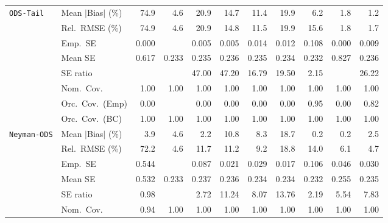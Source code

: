 \begin{landscape}
\begin{longtable}{llrrrrrrrrr}
\addlinespace[2pt]
\quad \texttt{ODS-Tail} & Mean $|$Bias$|$ (\%) & 74.9 & \cellcolor{rankthree}4.6 & 20.9 & 14.7 & 11.4 & 19.9 & 6.2 & \cellcolor{ranktwo}1.8 & \cellcolor{rankone}1.2 \\
 & Rel.\ RMSE (\%) & 74.9 & \cellcolor{rankthree}4.6 & 20.9 & 14.8 & 11.5 & 19.9 & 15.6 & \cellcolor{ranktwo}1.8 & \cellcolor{rankone}1.7 \\
 & Emp.\ SE & 0.000 &  & 0.005 & 0.005 & 0.014 & 0.012 & 0.108 & 0.000 & 0.009 \\
 & Mean SE & 0.617 & 0.233 & 0.235 & 0.236 & 0.235 & 0.234 & 0.232 & 0.827 & 0.236 \\
 & SE ratio &  &  & 47.00 & 47.20 & \cellcolor{ranktwo}16.79 & \cellcolor{rankthree}19.50 & \cellcolor{rankone}2.15 &  & 26.22 \\
 & Nom.\ Cov. & \cellcolor{rankone}1.00 & \cellcolor{rankone}1.00 & \cellcolor{rankone}1.00 & \cellcolor{rankone}1.00 & \cellcolor{rankone}1.00 & \cellcolor{rankone}1.00 & \cellcolor{rankone}1.00 & \cellcolor{rankone}1.00 & \cellcolor{rankone}1.00 \\
 & Orc.\ Cov.\ (Emp) & \cellcolor{rankthree}0.00 &  & \cellcolor{rankthree}0.00 & \cellcolor{rankthree}0.00 & \cellcolor{rankthree}0.00 & \cellcolor{rankthree}0.00 & \cellcolor{rankone}0.95 & \cellcolor{rankthree}0.00 & \cellcolor{ranktwo}0.82 \\
 & Orc.\ Cov.\ (BC) & \cellcolor{rankone}1.00 & \cellcolor{rankone}1.00 & \cellcolor{rankone}1.00 & \cellcolor{rankone}1.00 & \cellcolor{rankone}1.00 & \cellcolor{rankone}1.00 & \cellcolor{rankone}1.00 & \cellcolor{rankone}1.00 & \cellcolor{rankone}1.00 \\
\addlinespace[2pt]
\quad \texttt{Neyman-ODS} & Mean $|$Bias$|$ (\%) & 3.9 & 4.6 & \cellcolor{ranktwo}2.2 & 10.8 & 8.3 & 18.7 & \cellcolor{rankone}0.2 & \cellcolor{rankone}0.2 & \cellcolor{rankthree}2.5 \\
 & Rel.\ RMSE (\%) & 72.2 & \cellcolor{rankone}4.6 & 11.7 & 11.2 & 9.2 & 18.8 & 14.0 & \cellcolor{rankthree}6.1 & \cellcolor{ranktwo}4.7 \\
 & Emp.\ SE & 0.544 &  & 0.087 & 0.021 & 0.029 & 0.017 & 0.106 & 0.046 & 0.030 \\
 & Mean SE & 0.532 & 0.233 & 0.237 & 0.236 & 0.234 & 0.234 & 0.232 & 0.255 & 0.235 \\
 & SE ratio & \cellcolor{rankone}0.98 &  & \cellcolor{rankthree}2.72 & 11.24 & 8.07 & 13.76 & \cellcolor{ranktwo}2.19 & 5.54 & 7.83 \\
 & Nom.\ Cov. & \cellcolor{rankone}0.94 & \cellcolor{ranktwo}1.00 & \cellcolor{ranktwo}1.00 & \cellcolor{ranktwo}1.00 & \cellcolor{ranktwo}1.00 & \cellcolor{ranktwo}1.00 & \cellcolor{ranktwo}1.00 & \cellcolor{ranktwo}1.00 & \cellcolor{ranktwo}1.00 \\

\end{longtable}
\end{landscape}
